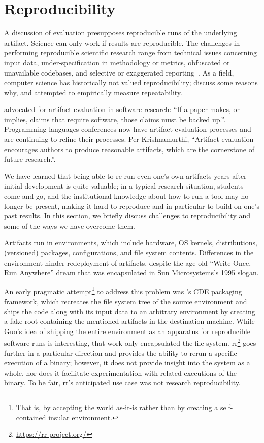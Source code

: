 \section{Reproducibility}
\label{sec:reproducibility}

A discussion of evaluation presupposes reproducible runs of the
underlying artifact. Science can only work if results are
reproducible.  The challenges in performing reproducible scientific
research range from technical issues concerning input data,
under-specification in methodology or metrics, obfuscated or
unavailable codebases, and selective or exaggerated
reporting~\cite{allison2018reproducibility}. As a field, computer
science has historically not valued reproducibility; 
discuss some reasons why, and 
attempted to empirically measure repeatability.

 advocated for artifact evaluation in software research: ``If a paper makes, or implies, claims that require software, those claims must be backed up.''. Programming languages conferences now have artifact evaluation processes and are continuing to refine their processes. Per Krishnamurthi, ``Artifact evaluation encourages authors to produce reasonable artifacts, which are the cornerstone of future research.''.

We have learned that being able to re-run even one's own artifacts years after 
initial development is quite valuable; in a typical research situation,
students come and go, and the institutional knowledge about how to run a
tool may no longer be present, making it hard to reproduce and in particular to build
on one's past results. In this section, we briefly discuss challenges
to reproducibility and some of the ways we have overcome them.

Artifacts run in environments, which include hardware, OS kernels,
distributions, (versioned) packages, configurations, and file system
contents. Differences in the environment hinder redeployment of artifacts,
despite the age-old ``Write Once, Run Anywhere'' dream that was encapsulated in
Sun Microsystems's 1995 slogan.

An early pragmatic attempt\footnote{That is, by accepting the world as-it-is rather than by creating a self-contained insular environment.} to address this problem was 's CDE 
packaging framework, which recreates the file system tree of the source environment and ships the code along with its input data to an arbitrary environment by creating a fake root containing the mentioned artifacts in the destination machine. While Guo's idea of shipping the entire environment as an apparatus for reproducible software runs is interesting, that work only encapsulated the file system. rr\footnote{\url{https://rr-project.org/}} goes further in a particular direction and provides the ability to rerun a specific execution of a binary; however, it does not provide insight into the system as a whole, nor does it facilitate experimentation with related executions of the binary. To be fair, rr's anticipated use case was not research reproducibility.

